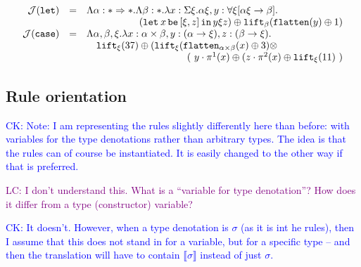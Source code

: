 \documentclass[runningheads,a4paper]{llncs}
\newcommand{\Termmap}{\mathcal{J}}
\newcommand{\quant}[2]{\forall #1[#2]}
\newcommand{\typeinterpret}[1]{\llbracket #1 \rrbracket}
\newcommand{\arrtype}{\rightarrow}
\newcommand{\arrkind}{\Rightarrow}
\newcommand{\flatten}{\mathtt{flatten}}
\newcommand{\lift}{\mathtt{lift}}
\newcommand{\xlet}[4]{\mathtt{let}_{#1}\,#2\,\mathtt{be}\,[#3]\,\mathtt{in}\,#4}
\newcommand{\CK}[1]{\textcolor{blue}{CK: #1}}
\newcommand{\LC}[1]{\textcolor{purple}{LC: #1}}
\begin{document}
\[
\begin{array}{rcl}
\Termmap(\mathtt{let}) & = & \Lambda \alpha : * \arrkind * . \Lambda \beta : * . \lambda x : \Sigma \xi . \alpha\xi,
  y : \quant{\xi}{\alpha\xi \arrtype \beta}. \\
  & & \hfill (\xlet{}{x}{\xi,z}{y\xi z}) \oplus \lift_{\beta}(\flatten(y) \oplus
  1) \\
\Termmap(\mathtt{case}) & = & \Lambda \alpha,\beta,\xi . \lambda x : \alpha \times \beta,
  y : (\alpha \arrtype \xi), z : (\beta \arrtype \xi). \\
  & & \quad
  \lift_\xi(37) \oplus (\lift_\xi(\flatten_{\alpha\times\beta}(x)\oplus 3)
  \otimes \\
  & & \quad\phantom{ABCDEFGHIJKL}
    (\ y \cdot \pi^1(x) \oplus (z \cdot \pi^2(x) \oplus \lift_\xi(11)\ ) \\
\end{array}
\]

\subsection{Rule orientation}

\CK{Note: I am representing the rules slightly differently here than
before: with variables for the type denotations rather than arbitrary
types.  The idea is that the rules can of course be instantiated.  It
is easily changed to the other way if that is preferred.}

\LC{I don't understand this. What is a ``variable for type
  denotation''? How does it differ from a type (constructor)
  variable?}

\CK{It doesn't. However, when a type denotation is $\sigma$ (as it is
  int he rules), then I assume that this does not stand in for a
  variable, but for a specific type -- and then the translation will
  have to contain $\typeinterpret{\sigma}$ instead of just $\sigma$.}
\end{document}
